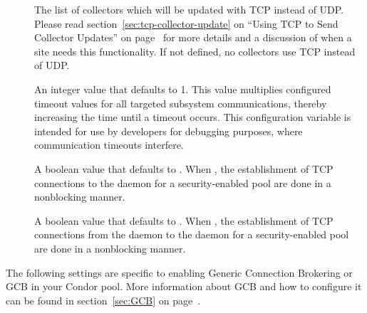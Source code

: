 \begin{description}
\item[]
  \label{param:TcpUpdateCollectors}
  The list of collectors which will be updated with TCP instead of UDP.
  Please read section~\ref{sec:tcp-collector-update} on ``Using TCP to
  Send Collector Updates'' on page~\pageref{sec:tcp-collector-update}
  for more details and a discussion of when a site needs this
  functionality. 
  If not defined, no collectors use TCP instead of UDP.

\item[]
  \label{param:SubsysTimeoutMultiplier}
  An integer value that defaults to 1.
  This value multiplies configured timeout values
  for all targeted subsystem communications,
  thereby increasing the time until a timeout occurs.
  This configuration variable is intended for use by developers for
  debugging purposes, where communication timeouts interfere.

\item[]
  \label{param:NonblockingCollectorUpdate}
  A boolean value that defaults to .
  When , the establishment of TCP connections
  to the  daemon
  for a security-enabled pool are done in a nonblocking manner.

\item[]
  \label{param:NegotiatorUseNonblockingStartdContact}
  A boolean value that defaults to .
  When , the establishment of TCP connections
  from the  daemon to the  daemon
  for a security-enabled pool are done in a nonblocking manner.

\end{description}

The following settings are specific to enabling Generic Connection
Brokering or GCB in your Condor pool.
More information about GCB and how to configure it can be found in
section~\ref{sec:GCB} on page~\pageref{sec:GCB}.

